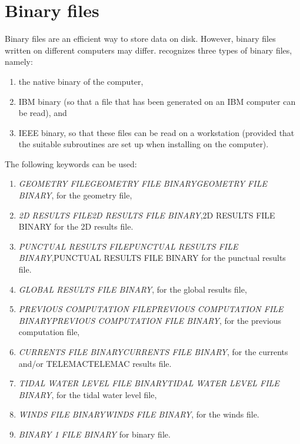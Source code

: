 \section{ Binary files }

 Binary files are an efficient way to store data on disk. However, binary files written on different computers may differ. \tomawac recognizes three types of binary files, namely:

\begin{enumerate}
\item  the native binary of the computer,

\item  IBM binary (so that a file that has been generated on an IBM computer can be read), and

\item  IEEE binary, so that these files can be read on a workstation (provided that the suitable subroutines are set up when installing \tomawac on the computer).
\end{enumerate}

 The following keywords can be used:

\begin{enumerate}
\item  \textit{GEOMETRY FILEGEOMETRY FILE BINARYGEOMETRY FILE BINARY}, for the geometry file,

\item  \textit{2D RESULTS FILE2D RESULTS FILE BINARY},2D RESULTS FILE BINARY for the 2D results file.

\item  \textit{PUNCTUAL RESULTS FILEPUNCTUAL RESULTS FILE BINARY},PUNCTUAL RESULTS FILE BINARY for the punctual results file.

\item  \textit{GLOBAL RESULTS FILE BINARY}, for the global results file,

\item  \textit{PREVIOUS COMPUTATION FILEPREVIOUS COMPUTATION FILE BINARYPREVIOUS COMPUTATION FILE BINARY}, for the previous computation file,

\item  \textit{CURRENTS FILE BINARYCURRENTS FILE BINARY}, for the currents and/or TELEMACTELEMAC results file.

\item  \textit{TIDAL WATER LEVEL FILE BINARYTIDAL WATER LEVEL FILE BINARY}, for the tidal water level file,

\item  \textit{WINDS FILE BINARYWINDS FILE BINARY}, for the winds file.

\item  \textit{BINARY 1 FILE BINARY }for binary file.
\end{enumerate}

